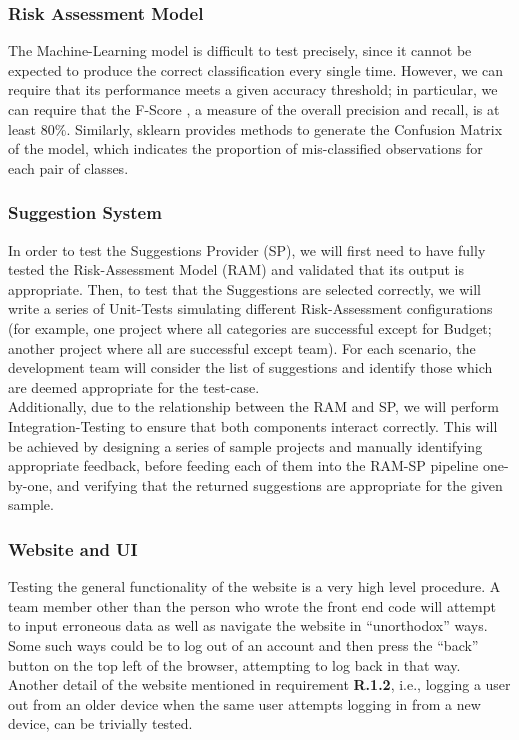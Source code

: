 \documentclass[a4paper]{article}
\theoremstyle{plain}
\theoremstyle{definition}
\theoremstyle{remark}
\begin{document}
\subsubsection*{Risk Assessment Model}
The Machine-Learning model is difficult to test precisely, since it cannot be expected to produce the correct classification every single time. However, we can require that its performance meets a given accuracy threshold; in particular, we can require that the F-Score \cite{scikit-learn}, a measure of the overall precision and recall, is at least $80\%$. Similarly, sklearn provides methods to generate the Confusion Matrix of the model, which indicates the proportion of mis-classified observations for each pair of classes. 
\subsubsection*{Suggestion System}
\noindent In order to test the Suggestions Provider (SP), we will first need to have fully tested the Risk-Assessment Model (RAM) and validated that its output is appropriate. Then, to test that the Suggestions are selected correctly, we will write a series of Unit-Tests simulating different Risk-Assessment configurations (for example, one project where all categories are successful except for Budget; another project where all are successful except team). For each scenario, the development team will consider the list of suggestions and identify those which are deemed appropriate for the test-case. \\

\noindent Additionally, due to the relationship between the RAM and SP, we will perform Integration-Testing to ensure that both components interact correctly. This will be achieved by designing a series of sample projects and manually identifying appropriate feedback, before feeding each of them into the RAM-SP pipeline one-by-one, and verifying that the returned suggestions are appropriate for the given sample.
\subsubsection*{Website and UI}
\noindent Testing the general functionality of the website is a very high level procedure. A team member other than the person who wrote the front end code will attempt to input erroneous data as well as navigate the website in “unorthodox” ways. Some such ways could be to log out of an account and then press the “back” button on the top left of the browser, attempting to log back in that way. Another detail of the website mentioned in requirement \textbf{R.1.2}, i.e., logging a user out from an older device when the same user attempts logging in from a new device, can be trivially tested.\\
\end{document}
